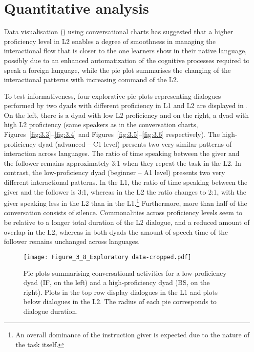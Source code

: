 \section{Quantitative analysis}
\label{sec:3.3}
Data visualisation () using conversational charts has suggested that a higher proficiency level in L2 enables a degree of smoothness in managing the interactional flow that is closer to the one learners show in their native language, possibly due to an enhanced automatization of the cognitive processes required to speak a foreign language, while the pie plot summarises the changing of the interactional patterns with increasing command of the L2. 

To test informativeness, four explorative pie plots representing dialogues performed by two dyads with different proficiency in L1 and L2 are displayed in . On the left, there is a dyad with low L2 proficiency and on the right, a dyad with high L2 proficiency (same speakers as in the conversation charts, Figures~\ref{fig:3.3}--\ref{fig:3.4} and Figures~\ref{fig:3.5}--\ref{fig:3.6} respectively). The high-proficiency dyad (advanced – C1 level) presents two very similar patterns of interaction across languages. The ratio of time speaking between the giver and the follower remains approximately 3:1 when they repeat the task in the L2. In contrast, the low-proficiency dyad (beginner – A1 level) presents two very different interactional patterns. In the L1, the ratio of time speaking between the giver and the follower is 3:1, whereas in the L2 the ratio changes to 2:1, with the giver speaking less in the L2 than in the L1.\footnote{An overall dominance of the instruction giver is expected due to the nature of the task itself.} Furthermore, more than half of the conversation consists of silence. Commonalities across proficiency levels seem to be relative to a longer total duration of the L2 dialogue, and a reduced amount of overlap in the L2, whereas in both dyads the amount of speech time of the follower remains unchanged across languages.

\begin{figure}
\texttt{[image: Figure\_3\_8\_Exploratory data-cropped.pdf]}
\caption{Pie plots summarising conversational activities for a low-proficiency dyad (IF, on the left) and a high-proficiency dyad (BS, on the right). Plots in the top row display dialogues in the L1 and plots below dialogues in the L2. The radius of each pie corresponds to dialogue duration.}
\label{fig:3.8}
\end{figure}


